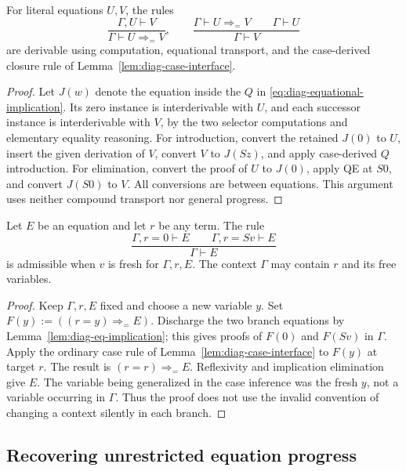 \begin{lemma}
\label{lem:diag-eq-implication}
For literal equations $U,V$, the rules
\[
 \frac{\Gamma,U\vdash V}{\Gamma\vdash U\Rightarrow_{=}V},
 \qquad
 \frac{\Gamma\vdash U\Rightarrow_{=}V\qquad\Gamma\vdash U}
      {\Gamma\vdash V}
\]
are derivable using computation, equational transport, and the
case-derived closure rule of Lemma~\ref{lem:diag-case-interface}.
\end{lemma}
\begin{proof}
Let $J(w)$ denote the equation inside the $Q$ in
\eqref{eq:diag-equational-implication}.
Its zero instance is interderivable with $U$, and each successor
instance is interderivable with $V$, by the two selector computations
and elementary equality reasoning.
For introduction, convert the retained $J(0)$ to $U$, insert the given
derivation of $V$, convert $V$ to $J(Sz)$, and apply case-derived
$Q$ introduction.  For elimination, convert the proof of $U$ to
$J(0)$, apply QE at $S0$, and convert $J(S0)$ to $V$.
All conversions are between equations.  This argument uses neither
compound transport nor general progress.
\end{proof}

\begin{lemma}
\label{lem:diag-dependent-cases}
Let $E$ be an equation and let $r$ be any term.  The rule
\[
 \frac{\Gamma,r=0\vdash E\qquad\Gamma,r=Sv\vdash E}
      {\Gamma\vdash E}
\]
is admissible when $v$ is fresh for $\Gamma,r,E$.
The context $\Gamma$ may contain $r$ and its free variables.
\end{lemma}
\begin{proof}
Keep $\Gamma,r,E$ fixed and choose a new variable $y$.
Set $F(y):=((r=y)\Rightarrow_{=}E)$.
Discharge the two branch equations by
Lemma~\ref{lem:diag-eq-implication}; this gives proofs of $F(0)$ and
$F(Sv)$ in $\Gamma$.  Apply the ordinary case rule of
Lemma~\ref{lem:diag-case-interface} to $F(y)$ at target $r$.
The result is $(r=r)\Rightarrow_{=}E$.
Reflexivity and implication elimination give $E$.
The variable being generalized in the case inference was the fresh
$y$, not a variable occurring in $\Gamma$.  Thus the proof does not
use the invalid convention of changing a context silently in each branch.
\end{proof}

\subsection{Recovering unrestricted equation progress}

